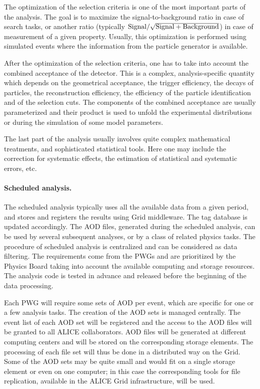 \documentclass[12pt,a4paper,twoside]{article}
\makeatletter
\newcommand {\grid} {Grid\@\xspace}
\makeatother
\begin{document}
{The optimization of the selection criteria is one of the most
important parts of the analysis. The goal is to maximize the
signal-to-background ratio in case of search tasks, or another 
ratio (typically ${\rm Signal/\sqrt{Signal+Background}}$) in
case of measurement of a given property.  Usually, this optimization is
performed using simulated events where the information from the
particle generator is available. 

After the optimization of the selection criteria, one has to take into
account the combined acceptance of the detector.  This is a complex,
analysis-specific quantity which depends on the geometrical acceptance,
the trigger efficiency, the decays of particles, the reconstruction
efficiency, the efficiency of the particle identification and of the
selection cuts. The components of the combined acceptance are usually
parameterized and their product is used to unfold the experimental
distributions or during the simulation of some model parameters. 

The last part of the analysis usually involves quite complex
mathematical treatments, and sophisticated statistical tools. Here one
may include the correction for systematic effects, the estimation of
statistical and systematic errors, etc.

\noindent
\paragraph{Scheduled analysis.}
\noindent
The scheduled analysis typically uses all
the available data from a given period, and stores and registers the results
using \grid middleware. The tag database is updated accordingly. The
AOD files, generated during the scheduled 
analysis, can be used by several subsequent analyses, or by a class of
related physics tasks. 
The procedure of scheduled analysis is centralized and can be
considered as data filtering. The requirements come from the PWGs and
are prioritized by the Physics Board taking into 
account the available computing and storage resources. The analysis
code is tested in advance and released before the beginning of the
data processing.

Each PWG will require some sets of
AOD per event, which are specific for one or
a few analysis tasks. The creation of the AOD sets is managed centrally.
The event list of each AOD set
will be registered and the access to the AOD files will be granted to
all ALICE collaborators.  AOD files will be generated 
at different computing centers and will be stored on
the corresponding storage 
elements.  The processing of each file set will thus be done in a
distributed way on the \grid. Some of the AOD sets may be quite small
and would fit on a single storage element or even on one computer; in
this case the corresponding tools for file replication, available
in the ALICE \grid infrastructure, will be used.

}
\end{document}
